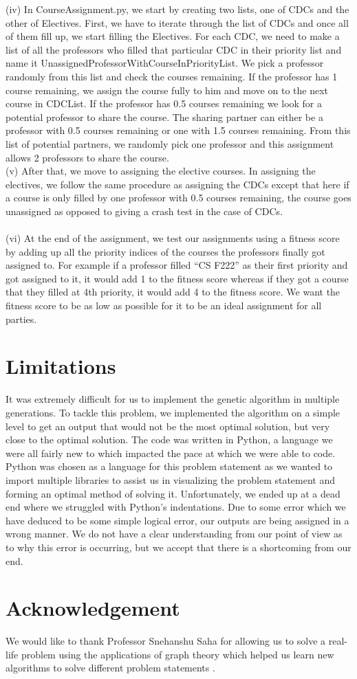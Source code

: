 \documentclass[a4paper,12pt]{article}
\begin{document}
(iv)  In CourseAssignment.py, we start by creating two lists, one of CDCs and the other of Electives. First, we have to iterate through the list of CDCs and once all of them fill up, we start filling the Electives. For each CDC, we need to make a list of all the professors who filled that particular CDC in their priority list and name it UnassignedProfessorWithCourseInPriorityList. We pick a professor randomly from this list and check the courses remaining. If the professor has 1 course remaining, we assign the course fully to him and move on to the next course in CDCList. If the professor has 0.5 courses remaining we look for a potential professor to share the course. The sharing partner can either be a professor with 0.5 courses remaining or one with 1.5 courses remaining. From this list of potential partners, we randomly pick one professor and this assignment allows 2 professors to share the course. \\


(v) After that, we move to assigning the elective courses. In assigning the electives, we follow the same procedure as assigning the CDCs except that here if a course is only filled by one professor with 0.5 courses remaining, the course goes unassigned as opposed to giving a crash test in the case of CDCs. \\ \\

(vi) At the end of the assignment, we test our assignments using a fitness score by adding up all the priority indices of the courses the professors finally got assigned to. For example if a professor filled “CS F222” as their first priority and got assigned to it, it would add 1 to the fitness score whereas if they got a course that they filled at 4th priority, it would add 4 to the fitness score. We want the fitness score to be as low as possible for it to be an ideal assignment for all parties. \\ 


\pagebreak
\section{Limitations}
It was extremely difficult for us to implement the genetic algorithm in multiple generations. To tackle this problem, we implemented the algorithm on a simple level to get an output that would not be the most optimal solution, but very close to the optimal solution. The code was written in Python, a language we were all fairly new to which impacted the pace at which we were able to code. Python was chosen as a language for this problem statement as we wanted to import multiple libraries to assist us in visualizing the problem statement and forming an optimal method of solving it. Unfortunately, we ended up at a dead end where we struggled with Python's indentations. Due to some error which we have deduced to be some simple logical error, our outputs are being assigned in a wrong manner. We do not have a clear understanding from our point of view as to why this error is occurring, but we accept that there is a shortcoming from our end. 

\section{Acknowledgement}
We would like to thank Professor Snehanshu Saha for allowing us to solve a real-life problem using the applications of graph theory which helped us learn new algorithms to solve different problem statements .\\
\end{document}
